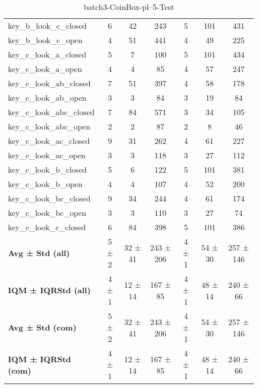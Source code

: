 \begin{table}[!ht]
\begin{tabular}{l|ccc|ccc}
key\_b\_look\_c\_closed & 6 & 42 & 243 & 5 & 101 & 431 \\
key\_b\_look\_c\_open & 4 & 51 & 441 & 4 & 49 & 225 \\
key\_c\_look\_a\_closed & 5 & 7 & 100 & 5 & 101 & 434 \\
key\_c\_look\_a\_open & 4 & 4 & 85 & 4 & 57 & 247 \\
key\_c\_look\_ab\_closed & 7 & 51 & 397 & 4 & 58 & 178 \\
key\_c\_look\_ab\_open & 3 & 3 & 84 & 3 & 19 & 84 \\
key\_c\_look\_abc\_closed & 7 & 84 & 571 & 3 & 34 & 105 \\
key\_c\_look\_abc\_open & 2 & 2 & 87 & 2 & 8 & 46 \\
key\_c\_look\_ac\_closed & 9 & 31 & 262 & 4 & 61 & 227 \\
key\_c\_look\_ac\_open & 3 & 3 & 118 & 3 & 27 & 112 \\
key\_c\_look\_b\_closed & 5 & 6 & 122 & 5 & 101 & 381 \\
key\_c\_look\_b\_open & 4 & 4 & 107 & 4 & 52 & 200 \\
key\_c\_look\_bc\_closed & 9 & 34 & 244 & 4 & 61 & 174 \\
key\_c\_look\_bc\_open & 3 & 3 & 110 & 3 & 27 & 74 \\
key\_c\_look\_c\_closed & 6 & 84 & 398 & 5 & 101 & 386 \\
\hline
\textbf{Avg ± Std (all)} & 5 ± 2 & 32 ± 41 & 243 ± 206 & 4 ± 1 & 54 ± 30 & 257 ± 146 \\
\textbf{IQM ± IQRStd (all)} & 4 ± 1 & 12 ± 14 & 167 ± 85 & 4 ± 1 & 48 ± 14 & 240 ± 66 \\
\textbf{Avg ± Std (com)} & 5 ± 2 & 32 ± 41 & 243 ± 206 & 4 ± 1 & 54 ± 30 & 257 ± 146 \\
\textbf{IQM ± IQRStd (com)} & 4 ± 1 & 12 ± 14 & 167 ± 85 & 4 ± 1 & 48 ± 14 & 240 ± 66 \\
\end{tabular}
\caption{batch3-CoinBox-pl--5-Test}
\label{tab:batch3_CoinBox_pl__5_comparison_test}
\end{table}
